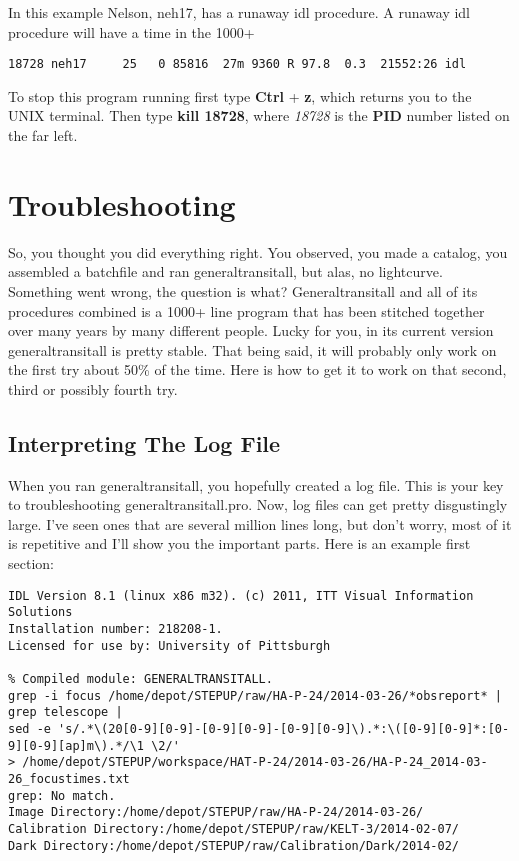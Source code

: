 \documentclass[10pt,preprint]{aastex}
\begin{document}
In this example Nelson, neh17, has a runaway idl procedure. A runaway idl procedure will have a time in the 1000+


\begin{verbatim}
18728 neh17     25   0 85816  27m 9360 R 97.8  0.3  21552:26 idl 
\end{verbatim}


To stop this program running first type \textbf{Ctrl} + \textbf{z}, which returns you to the UNIX terminal. Then type 
\textbf{kill 18728}, where \emph{18728} is the \textbf{PID} number listed on the far left.  

\section{Troubleshooting}
So, you thought you did everything right. You observed, you made a catalog, you assembled a batchfile and ran generaltransitall, but alas, no lightcurve. Something went wrong, the question is what? Generaltransitall and all of its procedures combined is a 1000+ line program that has been stitched together over many years by many different people. Lucky for you, in its current version generaltransitall is pretty stable. That being said, it will probably only work on the first try about 50\% of the time. Here is how to get it to work on that second, third or possibly fourth try.

\subsection{Interpreting The Log File} 
When you ran generaltransitall, you hopefully created a log file. This is your key to troubleshooting generaltransitall.pro. Now, log files can get pretty disgustingly large. I've seen ones that are several million lines long, but don't worry, most of it is repetitive and I'll show you the important parts. Here is an example first section:

\begin{verbatim}
IDL Version 8.1 (linux x86 m32). (c) 2011, ITT Visual Information Solutions
Installation number: 218208-1.
Licensed for use by: University of Pittsburgh

% Compiled module: GENERALTRANSITALL.
grep -i focus /home/depot/STEPUP/raw/HA-P-24/2014-03-26/*obsreport* | grep telescope | 
sed -e 's/.*\(20[0-9][0-9]-[0-9][0-9]-[0-9][0-9]\).*:\([0-9][0-9]*:[0-9][0-9][ap]m\).*/\1 \2/' 
> /home/depot/STEPUP/workspace/HAT-P-24/2014-03-26/HA-P-24_2014-03-26_focustimes.txt
grep: No match.
Image Directory:/home/depot/STEPUP/raw/HA-P-24/2014-03-26/
Calibration Directory:/home/depot/STEPUP/raw/KELT-3/2014-02-07/
Dark Directory:/home/depot/STEPUP/raw/Calibration/Dark/2014-02/
\end{verbatim}
\end{document}
